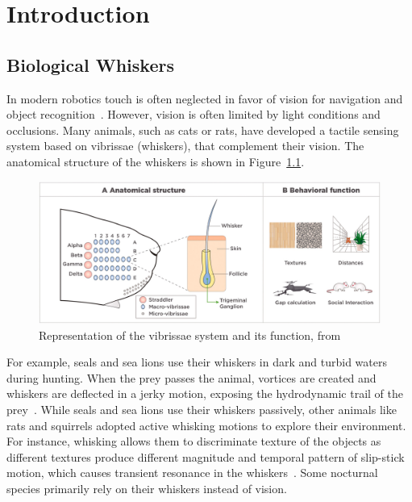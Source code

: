 

\chapter{Introduction}


\section{Biological Whiskers}

In modern robotics touch is often neglected in favor of vision for navigation and object recognition~\cite{s22072705}.
However, vision is often limited by light conditions and occlusions.
Many animals, such as cats or rats, have developed a tactile sensing system based on vibrissae (whiskers), that complement their vision.
The anatomical structure of the whiskers is shown in Figure~\ref{fig:whisker-anatomy}.

\begin{figure}[htb]
    \centering
    \includegraphics[width=\textwidth]{figures/whisker-anatomy}
    \caption{Representation of the vibrissae system and its function, from~\cite{IBARRACASTANEDA2022100034}}
    \label{fig:whisker-anatomy}
\end{figure}

For example, seals and sea lions use their whiskers in dark and turbid waters during hunting.
When the prey passes the animal, vortices are created and whiskers are deflected in a jerky motion, exposing the hydrodynamic trail of the prey~\cite{muthuramalingam2018sealsealionwhiskers}.
While seals and sea lions use their whiskers passively, other animals like rats and squirrels adopted active whisking motions to explore their environment.
For instance, whisking allows them to discriminate texture of the objects as different textures produce different magnitude and temporal pattern of slip-stick motion, which causes transient resonance in the whiskers~\cite{wolfe2008texture}.
Some nocturnal species primarily rely on their whiskers instead of vision.


